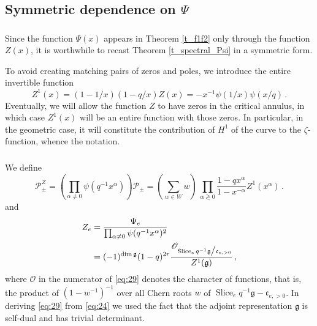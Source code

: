 \documentclass[14pt]{extarticle}
\newcommand{\cP}{\mathscr{P}}
\newcommand{\fg}{\mathfrak{g}}
\newcommand{\fc}{\mathfrak{c}}
\newcommand{\cO}{\mathscr{O}}
\DeclareMathOperator{\Slice}{Slice}
\theoremstyle{definition}
\begin{document}
 
 \subsection{Symmetric dependence on $\Psi$}

 \subsubsection{}

 Since the function $\Psi(x)$ appears in Theorem \ref{t_f1f2} only
 through the function $Z(x)$, it is worthwhile to recast Theorem
 \ref{t_spectral_Psi} in a symmetric form.

 To avoid creating matching pairs of zeros and poles, we introduce
 the entire invertible function
 \begin{equation}
   \label{eq:118_Z1}
   Z^1(x) = (1-1/x)(1-q/x) Z(x) = - x^{-1} \psi(1/x) \psi(x/q) \,.
 \end{equation}
 Eventually, we will allow the function $Z$ to have zeros in the
 critical annulus, in which case $Z^1(x)$ will be an entire function
 with those zeros. In particular, in the geometric case, it will
 constitute the contribution of $H^1$ of the curve
 to the $\zeta$-function, whence the notation.

 \subsubsection{}


 We define
 \begin{equation}
   \label{eq:24}
   \cP^Z_{\pm}  = \left(\prod_{\alpha \ne 0} \psi(q^{-1}
  x^\alpha) \right) \cP_\pm  = \left(\sum_{w \in W} w \right)\,
   \prod_{\alpha \gtrless 0 } \frac{1-q x^\alpha}{1-x^{-\alpha}} Z^1(x^\alpha) 
   \,. 
\end{equation}
%
and
%
\begin{align}
Z_e &= \frac{\Psi_e}{\prod_{\alpha \ne 0} \psi(q^{-1}
      x^\alpha)^2}\notag\\
  &= (-1)^{\dim\fg} (1-q)^{2r}
  \frac{\cO_{\Slice_e q^{-1} \fg
    \big/\fc_{e,>0}}}{Z^1(\fg)}\label{eq:29} \,, 
\end{align}
%
where $\cO$ in the numerator of \eqref{eq:29}  denotes the character of functions, that is, the product
of $(1-w^{-1})^{-1}$ over all Chern roots $w$ of $\Slice_e q^{-1} \fg -
\fc_{e,>0}$. In deriving \eqref{eq:29} from \eqref{eq:24} we used
the fact that the adjoint representation $\fg$ is self-dual and has
trivial determinant. 
\end{document}
